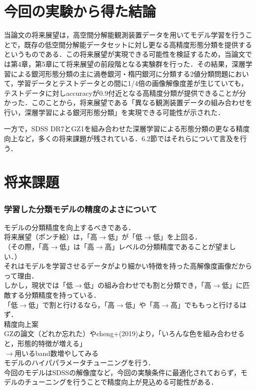 \documentclass[a4j, 11pt]{jreport}
\begin{document}
\section{今回の実験から得た結論}
当論文の将来展望は，高空間分解能観測装置データを用いてモデル学習を行うことで，既存の低空間分解能データセットに対し更なる高精度形態分類を提供するというものである．この将来展望が実現できる可能性を検証するため，当論文では第4章，第5章にて将来展望の前段階となる実験群を行った．その結果，深層学習による銀河形態分類の主に渦巻銀河・楕円銀河に分類する2値分類問題において，学習データとテストデータとの間に1/4倍の画像解像度差が生じていても，テストデータに対しaccuracyが0.9付近となる高精度分類が提供できることが分かった．このことから，将来展望である「異なる観測装置データの組み合わせを行い，深層学習による銀河形態分類」を実現できる可能性が示された．

一方で，SDSS DR7とGZ1を組み合わせた深層学習による形態分類の更なる精度向上など，多くの将来課題が残されている．6.2節ではそれらについて言及を行う．

\section{将来課題}
\subsubsection{学習した分類モデルの精度のよさについて}
モデルの分類精度を向上するべきである．\\
将来展望（ポンチ絵）は，「高$\to$低」が「低$\to$低」を上回る．\\
（その際，「高$\to$低」は「高$\to$高」レベルの分類精度であることが望ましい．）\\
それはモデルを学習させるデータがより細かい特徴を持った高解像度画像だからって理由．\\

しかし，現状では「低$\to$低」の組み合わせでも割と分類でき，「高$\to$低」に匹敵する分類精度を持っている．\\
「低$\to$低」で割と行けるなら，「高$\to$低」や「高$\to$高」でももっと行けるはず．\\

精度向上案\\
GZの論文（どれか忘れた）やcheng+(2019)より，「いろんな色を組み合わせると，形態的特徴が増える」\\
$\to$用いるband数増やしてみる\\
モデルのハイパパラメータチューニングを行う．\\
今回のモデルはSDSSの解像度など，今回の実験条件に最適化されておらず，モデルのチューニングを行うことで精度向上が見込める可能性がある．\\
\end{document}
